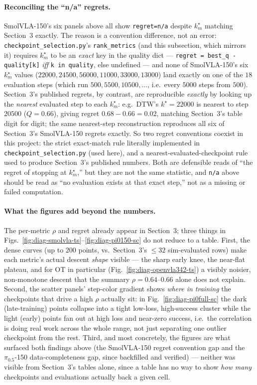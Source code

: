 \documentclass[11pt]{article}
\begin{document}
\paragraph{Reconciling the ``n/a'' regrets.} SmolVLA-150's six panels above all show
\texttt{regret=n/a} despite $k_m^\star$ matching Section~3 exactly. The reason is a convention
difference, not an error: \texttt{checkpoint\_selection.py}'s \texttt{rank\_metrics} (and this
subsection, which mirrors it) requires $k_m^\star$ to be an \emph{exact} key in the quality dict ---
\texttt{regret = best\_q - quality[k]} \emph{iff} \texttt{k in quality}, else undefined --- and none of
SmolVLA-150's six $k_m^\star$ values ($22000,24500,56000,11000,33000,13000$) land exactly on one of the
$18$ evaluation steps (which run $500,5500,10500,\dots$, i.e.\ every $5000$ steps from $500$). Section~3's
published regrets, by contrast, are reproducible \emph{exactly} by looking up the \emph{nearest}
evaluated step to each $k_m^\star$: e.g.\ DTW's $k^\star{=}22000$ is nearest to step $20500$
($Q{=}0.66$), giving regret $0.68-0.66=0.02$, matching Section~3's table digit for digit; the same
nearest-step reconstruction reproduces all six of Section~3's SmolVLA-150 regrets exactly. So two
regret conventions coexist in this project: the strict exact-match rule literally implemented in
\texttt{checkpoint\_selection.py} (used here), and a nearest-evaluated-checkpoint rule used to produce
Section~3's published numbers. Both are defensible reads of ``the regret of stopping at $k_m^\star$,''
but they are not the same statistic, and \texttt{n/a} above should be read as ``no evaluation exists at
that exact step,'' not as a missing or failed computation.

\paragraph{What the figures add beyond the numbers.} The per-metric $\rho$ and regret already appear in
Section~3; three things in Figs.~\ref{fig:diag-smolvla-ts}--\ref{fig:diag-pi0150-sc} do not reduce to a
table. First, the dense curves (up to $200$ points, vs.\ Section~3's $\le32$ sim-evaluated rows) make
each metric's actual descent \emph{shape} visible --- the sharp early knee, the near-flat plateau, and
for OT in particular (Fig.~\ref{fig:diag-openvla342-ts}) a visibly noisier, non-monotone descent that
the summary $\rho{=}0.64$--$0.66$ alone does not explain. Second, the scatter panels' step-color gradient
shows \emph{where in training} the checkpoints that drive a high $\rho$ actually sit: in
Fig.~\ref{fig:diag-pi0full-sc} the dark (late-training) points collapse into a tight low-loss,
high-success cluster while the light (early) points fan out at high loss and near-zero success, i.e.\
the correlation is doing real work across the whole range, not just separating one outlier checkpoint
from the rest. Third, and most concretely, the figures are what surfaced both findings above (the
SmolVLA-150 regret convention gap and the $\pi_{0.5}$-150 data-completeness gap, since backfilled and
verified) --- neither was visible from Section~3's tables alone, since a table has no way to show
\emph{how many} checkpoints and evaluations actually back a given cell.
\end{document}
